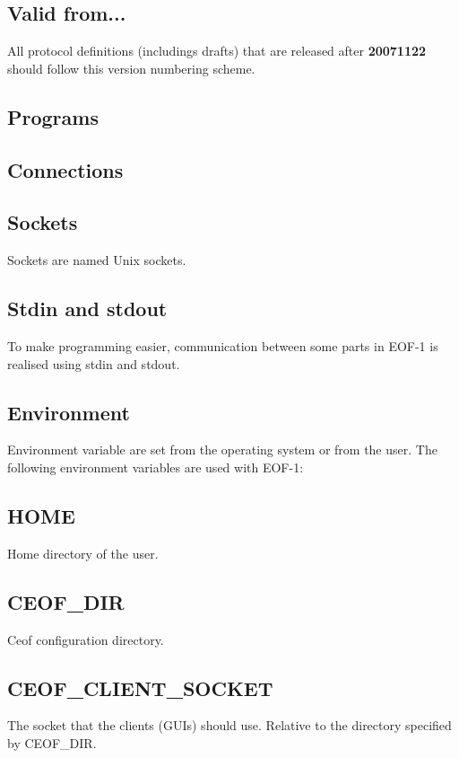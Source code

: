 \documentclass[12pt,a4paper]{book}
\begin{document}
\subsection{Valid from...}
All protocol definitions (includings drafts) that are released after
\textbf{20071122} should follow this version numbering scheme.
\subsection{Programs}
\subsection{Connections}
\subsection{Sockets}
Sockets are named Unix sockets.
\subsection{Stdin  and stdout}
To make programming easier, communication between some parts in EOF-1 is realised
using stdin and stdout. 
\subsection{Environment}
Environment variable are set from the operating system or from the user.
The following environment variables are used with EOF-1:
\subsection{HOME}
Home directory of the user.
\subsection{CEOF\_DIR}
Ceof configuration directory.
\subsection{CEOF\_CLIENT\_SOCKET}
The socket that the clients (GUIs) should use.
Relative to the directory specified by CEOF\_DIR.
\end{document}
